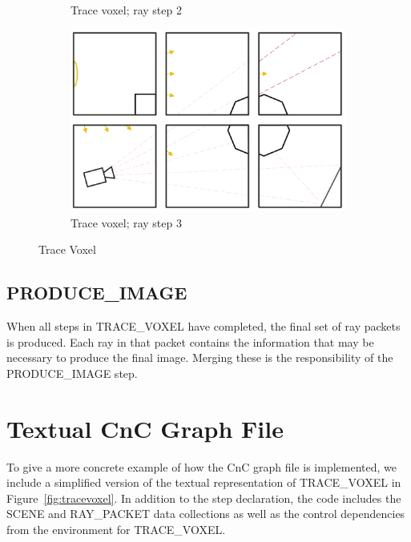 \begin{figure}[!htb]
\begin{subfigure}{.49\columnwidth}
  \caption{Trace voxel; ray step 2}
\end{subfigure}
\begin{subfigure}{.49\columnwidth}
 \centering
  \includegraphics[width=.98\columnwidth]{drawings/Trace4.pdf}
  \caption{Trace voxel; ray step 3}
\end{subfigure}
\caption{Trace Voxel}
\label{fig:trace}
\end{figure}

\subsection{PRODUCE\_IMAGE}
When all steps in TRACE\_VOXEL have completed, the final set of ray
packets is produced. Each ray in that packet contains the information
that may be necessary to produce the final image. Merging these is the
responsibility of the PRODUCE\_IMAGE step.

\section{Textual CnC Graph File}
To give a more concrete example of how the CnC graph file is
implemented, we include a simplified version of the textual
representation of TRACE\_VOXEL in Figure~\ref{fig:tracevoxel}. In
addition to the step declaration, the code includes the SCENE and
RAY\_PACKET data collections as well as the control dependencies from
the environment for TRACE\_VOXEL.

